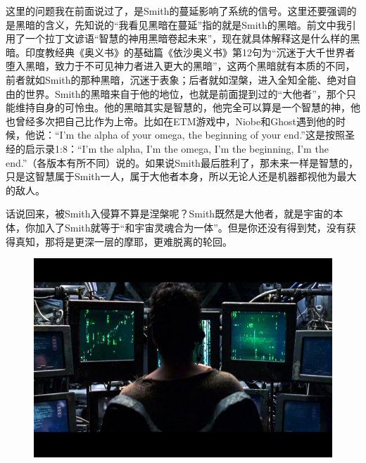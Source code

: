 \documentclass[UTF8]{ctexart}
\begin{document}
这里的问题我在前面说过了，是Smith的蔓延影响了系统的信号。这里还要强调的是黑暗的含义，先知说的“我看见黑暗在蔓延”指的就是Smith的黑暗。前文中我引用了一个拉丁文谚语“智慧的神用黑暗卷起未来”，现在就具体解释这是什么样的黑暗。印度教经典《奥义书》的基础篇《依沙奥义书》第12句为“沉迷于大千世界者堕入黑暗，致力于不可见神力者进入更大的黑暗”，这两个黑暗就有本质的不同，前者就如Smith的那种黑暗，沉迷于表象；后者就如涅槃，进入全知全能、绝对自由的世界。Smith的黑暗来自于他的地位，也就是前面提到过的“大他者”，那个只能维持自身的可怜虫。他的黑暗其实是智慧的，他完全可以算是一个智慧的神，他也曾经多次把自己比作为上帝。比如在ETM游戏中，Niobe和Ghost遇到他的时候，他说：“I'm the alpha of your omega, the beginning of your end.”这是按照圣经的启示录1:8：“I'm the alpha, I'm the omega, I'm the beginning, I'm the end.”（各版本有所不同）说的。如果说Smith最后胜利了，那未来一样是智慧的，只是这智慧属于Smith一人，属于大他者本身，所以无论人还是机器都视他为最大的敌人。

话说回来，被Smith入侵算不算是涅槃呢？Smith既然是大他者，就是宇宙的本体，你加入了Smith就等于“和宇宙灵魂合为一体”。但是你还没有得到梵，没有获得真知，那将是更深一层的摩耶，更难脱离的轮回。

\begin{figure}[htb]
\centering
\includegraphics[width=0.5\linewidth]{fig/e7e946101bf652fcc2ce7923.jpg}
\end{figure}
\end{document}
